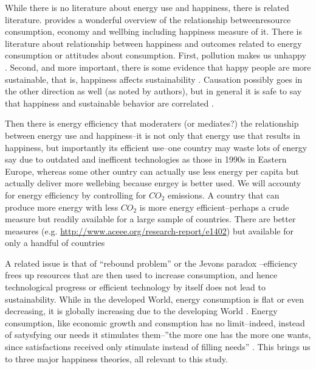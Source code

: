 \documentclass[10pt, letterpaper]{article}
\begin{document}
\begin{spacing}{1.4}

While there is no literature about energy use and happiness, there is related
literature. \citet{pretty13} provides a wonderful overview of the relationship
betweenresource consumption, economy and wellbing including happiness measure of
it. There is literature about relationship between happiness and outcomes
related to energy consumption or attitudes about consumption. First, pollution makes us unhappy \citep{weinhold12,welsch05}. Second,
and more important,  there is some evidence that happy people
are more sustainable, that is, happiness affects sustainability
\citep{ericson14}.  Causation possibly goes in the
other direction as well (as noted by authors), but in general it is
safe to say that happiness and sustainable behavior are correlated  \citep{brown05,corral11}.

Then there is energy efficiency that moderaters (or mediates?) the relationship
between energy use and happiness--it is not only that energy use that results in
happiness, but importantly its efficient use--one country may waste lots of
energy say due to outdated and inefficent technologies as those in 1990s in
Eastern Europe, whereas some other ountry can actually use less energy per
capita but actually deliver more wellebing because enrgey is better used. We
will accounty for  energy efficiency by controlling for  $CO_2$ emissions. 
 A country that can produce more energy with less $CO_2$ is more energy
 efficient--perhaps a crude measure but readily available for a large sample of
 countries. There are better measures (e.g. \url{http://www.aceee.org/research-report/e1402}) but available for only a handful of countries

A related issue is that of ``rebound problem'' or the Jevons paradox
\citep{pretty13}%
--efficiency frees up resources that are then used to increase consumption, and
hence technological progress or efficient technology by itself does not lead to
sustainability. While in the developed World, energy consumption is flat or even
decreasing, it is globally increasing due to the developing World
\citep{pretty13}. Energy consumption, like economic growth and consmption has no
limit--indeed, instead of satysfying our needs it stimulates them--''the more
one has the more one wants, since satisfactions received only stimulate instead
of filling needs''   \citep{durkheim50}. This brings us to three major happiness
theories, all relevant to this study. 


\end{spacing}
\end{document}
